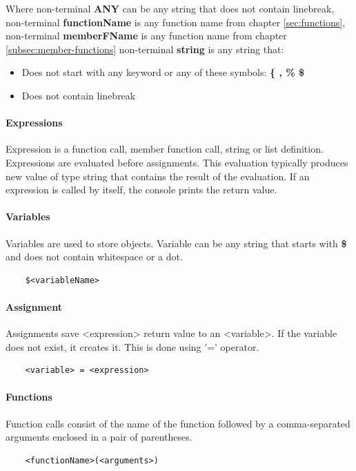 \documentclass{ctuthesis}
\begin{document}
Where non-terminal \textbf{ANY} can be any string that does not contain linebreak, non-terminal \textbf{functionName} is any function name from chapter \ref{sec:functions}, non-terminal \textbf{memberFName} is any function name from chapter \ref{subsec:member-functions} non-terminal \textbf{string} is any string that:
\begin{itemize}
	\item Does not start with any keyword or any of these symbols: \textbf{\{ , \% \$}
	\item Does not contain linebreak
\end{itemize}

\paragraph{Expressions}
Expression is a function call, member function call, string or list definition. Expressions are evaluated before assignments. This evaluation typically produces new value of type string that contains the result of the evaluation. If an expression is called by itself, the console prints the return value.

\paragraph{Variables}
Variables are used to store objects. Variable can be any string that starts with \textbf{\$} and does not contain whitespace or a dot.
\begin{verbatim}
	$<variableName>
\end{verbatim}

\paragraph{Assignment}
Assignments save <expression> return value to an <variable>. If the variable does not exist, it creates it. This is done using '=' operator.
\begin{verbatim}
	<variable> = <expression>
\end{verbatim} 


\paragraph{Functions}
Function calls consist of the name of the function followed by a comma-separated arguments enclosed in a pair of parentheses. 
\begin{verbatim}
	<functionName>(<arguments>)
\end{verbatim}
\end{document}
